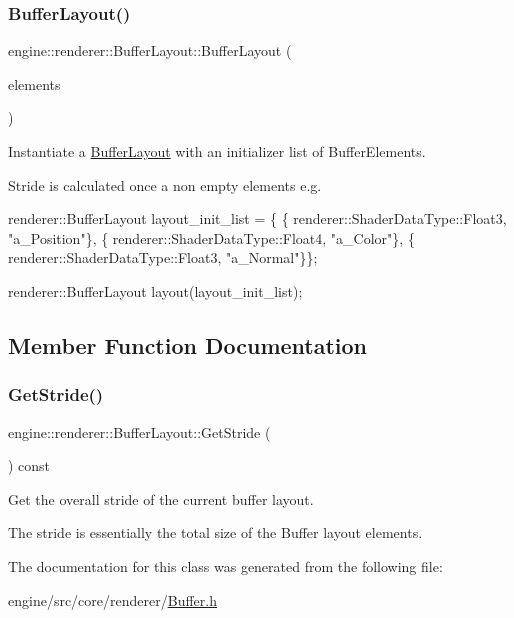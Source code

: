 \subsubsection{\texorpdfstring{Buffer\+Layout()}{BufferLayout()}}
{\footnotesize\ttfamily engine\+::renderer\+::\+Buffer\+Layout\+::\+Buffer\+Layout (\begin{DoxyParamCaption}\item[{const std\+::initializer\+\_\+list$<$ \hyperlink{structengine_1_1renderer_1_1BufferElement}{Buffer\+Element} $>$ \&}]{elements }\end{DoxyParamCaption})\hspace{0.3cm}{\ttfamily [inline]}}



Instantiate a \hyperlink{classengine_1_1renderer_1_1BufferLayout}{Buffer\+Layout} with an initializer list of Buffer\+Elements. 

Stride is calculated once a non empty elements e.\+g. 
\begin{DoxyCode}
renderer::BufferLayout layout\_init\_list = \{
    \{ renderer::ShaderDataType::Float3, \textcolor{stringliteral}{"a\_Position"}\},
    \{ renderer::ShaderDataType::Float4, \textcolor{stringliteral}{"a\_Color"}\},
    \{ renderer::ShaderDataType::Float3, \textcolor{stringliteral}{"a\_Normal"}\}\};

renderer::BufferLayout layout(layout\_init\_list);
\end{DoxyCode}
 

\subsection{Member Function Documentation}
\mbox{\label{classengine_1_1renderer_1_1BufferLayout_abf525eed067da7cfa637c9fe795767b5}} 
\subsubsection{\texorpdfstring{Get\+Stride()}{GetStride()}}
{\footnotesize\ttfamily engine\+::renderer\+::\+Buffer\+Layout\+::\+Get\+Stride (\begin{DoxyParamCaption}{ }\end{DoxyParamCaption}) const\hspace{0.3cm}{\ttfamily [inline]}}



Get the overall stride of the current buffer layout. 

The stride is essentially the total size of the Buffer layout elements. 

The documentation for this class was generated from the following file\+:\begin{DoxyCompactItemize}
\item 
engine/src/core/renderer/\hyperlink{Buffer_8h}{Buffer.\+h}\end{DoxyCompactItemize}
